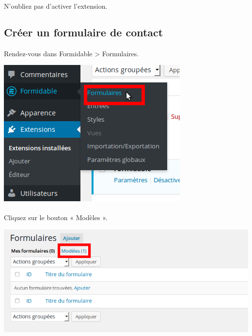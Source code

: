 \documentclass[10pt,a4paper]{article}
\begin{document}
\paragraph{}N'oubliez pas d'activer l'extension.
\subsection{Créer un formulaire de contact}
\paragraph{}Rendez-vous dans Formidable > Formulaires.
\begin{center}
\includegraphics[scale=0.3]{img/0180.png}
\end{center}
\paragraph{}Cliquez sur le bouton « Modèles ».
\begin{center}
\includegraphics[scale=0.3]{img/0181.png}
\end{center}
\end{document}
